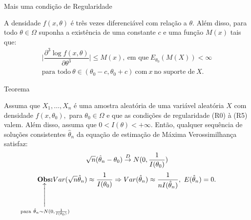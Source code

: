 \documentclass[12pt]{beamer}
\begin{document}
\begin{frame}{Mais uma condição de Regularidade}
\begin{block}{}
{\noindent
\begin{description}
\justifying
\item[(R5)~]A densidade $f(x,\theta)$ é três vezes diferenciável com relação a $\theta.$ Além disso, para todo $\theta\in \Omega$ suponha a existência de uma constante $c$ e uma função $M(x)$ tais que:
\begin{align*}
    \Bigg|\dfrac{\partial^{3}\log{f(x,\theta)}}{\partial\theta^{3}}\Bigg|\leq M(x),~\text{em que}~
    E_{\theta_{0}}(M(X))<\infty\\
    \text{para todo}~\theta\in(\theta_{0}-c,\theta_{0}+c)~\text{com}~x~\text{no suporte de}~X.
\end{align*}
\end{description}}
\end{block}
\end{frame}

\begin{frame}{Teorema}
\vspace{-0.2cm}
\begin{Teorema}
\justifying
Assuma que $X_{1},\ldots,X_{n}$ é uma amostra aleatória de uma variável aleatória $X$ com densidade $f(x,\theta_{0}),$ para $\theta_{0}\in\Omega$ e que as condições de regularidade (R0) à (R5) valem. Além disso, assuma que $0<I(\theta)<+\infty.$ Então, qualquer sequência de soluções consistentes $\hat{\theta}_{n}$ da equação de estimação de Máxima Verossimilhança satisfaz:
\begin{align*}
    \sqrt{n}(\hat{\theta}_{n}-\theta_{0})\overset{D}{\rightarrow} N(0,\dfrac{1}{I(\theta_{0})})
\end{align*}
\begin{align*}
\SetaUP{\text{para}~\hat{\theta}_{n}\sim N(0,\frac{1}{I(\theta_{0})})}{\textbf{Obs:}}Var(\sqrt{n}\hat{\theta}_{n})\approx\dfrac{1}{I(\theta_{0})}\Rightarrow Var(\hat{\theta}_{n})\approx\dfrac{1}{nI(\hat{\theta}_{n})},~E(\hat{\theta}_{n})=0.    
\end{align*}
\end{Teorema}
\end{frame}
\end{document}
